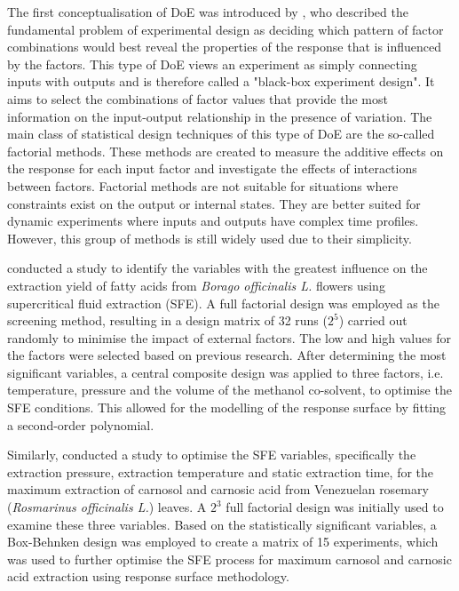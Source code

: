 \documentclass[a4paper,fleqn]{cas-dc}
\begin{document}
The first conceptualisation of DoE was introduced by \citet{Fisher1935}, who described the fundamental problem of experimental design as deciding which pattern of factor combinations would best reveal the properties of the response that is influenced by the factors. This type of DoE views an experiment as simply connecting inputs with outputs and is therefore called a "black-box experiment design". It aims to select the combinations of factor values that provide the most information on the input-output relationship in the presence of variation. The main class of statistical design techniques of this type of DoE are the so-called factorial methods. These methods are created to measure the additive effects on the response for each input factor and investigate the effects of interactions between factors. Factorial methods are not suitable for situations where constraints exist on the output or internal states. They are better suited for dynamic experiments where inputs and outputs have complex time profiles. However, this group of methods is still widely used due to their simplicity.

\citet{Ramandi2011} conducted a study to identify the variables with the greatest influence on the extraction yield of fatty acids from \textit{Borago officinalis L.} flowers using supercritical fluid extraction (SFE). A full factorial design was employed as the screening method, resulting in a design matrix of 32 runs ($2^5$) carried out randomly to minimise the impact of external factors. The low and high values for the factors were selected based on previous research. After determining the most significant variables, a central composite design was applied to three factors, i.e. temperature, pressure and the volume of the methanol co-solvent, to optimise the SFE conditions. This allowed for the modelling of the response surface by fitting a second-order polynomial.

Similarly, \citet{Caldera2012} conducted a study to optimise the SFE variables, specifically the extraction pressure, extraction temperature and static extraction time, for the maximum extraction of carnosol and carnosic acid from Venezuelan rosemary (\textit{Rosmarinus officinalis L.}) leaves. A $2^3$ full factorial design was initially used to examine these three variables. Based on the statistically significant variables, a Box-Behnken design was employed to create a matrix of 15 experiments, which was used to further optimise the SFE process for maximum carnosol and carnosic acid extraction using response surface methodology.
\end{document}

